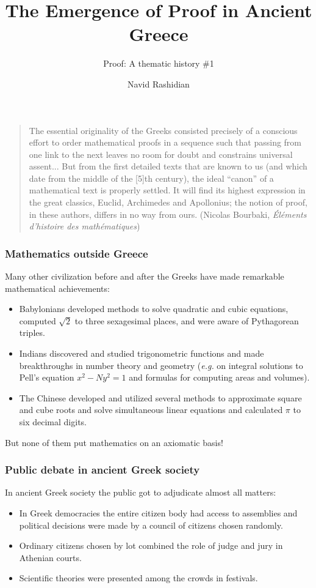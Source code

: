 \documentclass[compress,12pt]{beamer}
\title{The Emergence of Proof in Ancient Greece}
\subtitle{Proof: A thematic history \#1}
\date{}
\author{Navid Rashidian}
\institute{University of Tehran}
\begin{document}
\frame[plain]{\titlepage}


\begin{frame}[bg=bourbaki.png]
    \begin{quote}
        The essential originality of the Greeks consisted precisely of a conscious effort to order mathematical proofs in a sequence such that passing from one link to the next leaves no room for doubt and constrains universal assent... But from the first detailed texts that are known to us (and which date from the middle of the [5]th century), the ideal ``canon'' of a mathematical text is properly settled. It will find its highest expression in the great classics, Euclid, Archimedes and Apollonius; the notion of proof, in these authors, differs in no way from ours. (Nicolas Bourbaki, \emph{Éléments d'histoire des mathématiques})
    \end{quote}
\end{frame}

\begin{frame}
      \frametitle{Mathematics outside Greece}
      Many other civilization before and after the Greeks have made remarkable mathematical achievements:
      \begin{itemize}
            \item Babylonians developed methods to solve quadratic and cubic equations, computed $\sqrt 2$ to three sexagesimal places, and were aware of Pythagorean triples.
            \item Indians discovered and studied trigonometric functions and made breakthroughs in number theory and geometry (\emph{e.g.} on integral solutions to Pell's equation $x^2-Ny^2=1$ and formulas for computing areas and volumes).
            \item The Chinese developed and utilized several methods to approximate square and cube roots and solve simultaneous linear equations and calculated $\pi$ to six decimal digits.
      \end{itemize}
      But none of them put mathematics on an axiomatic basis!
\end{frame}

\begin{frame}
    \frametitle{Public debate in ancient Greek society}
    In ancient Greek society the public got to adjudicate almost all matters:
    \begin{itemize}
        \item In Greek democracies the entire citizen body had access to assemblies and political decisions were made by a council of citizens chosen randomly.
        \item Ordinary citizens chosen by lot combined the role of judge and jury in Athenian courts.
        \item Scientific theories were presented among the crowds in festivals.
    \end{itemize}
\end{frame}
\end{document}
